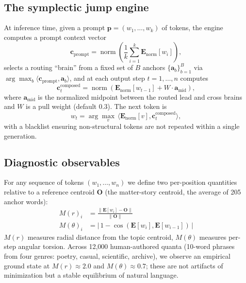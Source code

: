 \documentclass[11pt,a4paper]{article}
\begin{document}
\subsection{The symplectic jump engine}
At inference time, given a prompt $\mathbf{p} = (w_1, \ldots, w_k)$ of tokens, the engine computes a prompt context vector
\begin{equation}
\mathbf{c}_{\text{prompt}} = \operatorname{norm}\!\left(\frac{1}{k}\sum_{i=1}^{k} \mathbf{E}_{\text{norm}}[w_i]\right),
\end{equation}
selects a routing ``brain'' from a fixed set of $B$ anchors $\{\mathbf{a}_b\}_{b=1}^{B}$ via $\arg\max_b \langle \mathbf{c}_{\text{prompt}}, \mathbf{a}_b \rangle$, and at each output step $t = 1, \ldots, n$ computes
\begin{equation}
\mathbf{c}_t^{\text{composed}} = \operatorname{norm}\!\left(\mathbf{E}_{\text{norm}}[w_{t-1}] + W \cdot \mathbf{a}_{\text{mid}} \right),
\end{equation}
where $\mathbf{a}_{\text{mid}}$ is the normalized midpoint between the routed lead and cross brains and $W$ is a pull weight (default $0.3$). The next token is
\begin{equation}\label{eq:argmax}
w_t = \arg\max_{v} \, \langle \mathbf{E}_{\text{norm}}[v], \mathbf{c}_t^{\text{composed}} \rangle,
\end{equation}
with a blacklist ensuring non-structural tokens are not repeated within a single generation.

\subsection{Diagnostic observables}
For any sequence of tokens $(w_1, \ldots, w_n)$ we define two per-position quantities relative to a reference centroid $\mathbf{O}$ (the matter-story centroid, the average of 205 anchor words):
\begin{align}
M(r)_i &= \frac{\lVert \mathbf{E}[w_i] - \mathbf{O} \rVert}{\lVert \mathbf{O} \rVert} \\
M(\theta)_i &= \bigl|\, 1 - \cos(\mathbf{E}[w_i], \mathbf{E}[w_{i-1}]) \,\bigr|
\end{align}
$M(r)$ measures radial distance from the topic centroid, $M(\theta)$ measures per-step angular torsion. Across 12{,}000 human-authored quanta (10-word phrases from four genres: poetry, casual, scientific, archive), we observe an empirical ground state at $M(r) \approx 2.0$ and $M(\theta) \approx 0.7$; these are not artifacts of minimization but a stable equilibrium of natural language.
\end{document}
